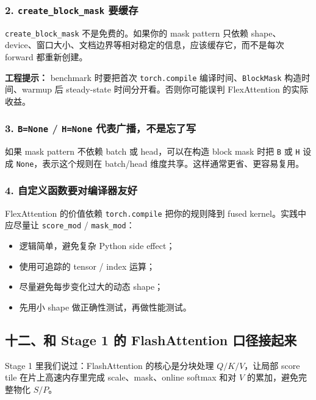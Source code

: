 \subsubsection*{2. \texttt{create\_block\_mask} 要缓存}

\texttt{create\_block\_mask} 不是免费的。如果你的 mask pattern 只依赖 shape、device、窗口大小、文档边界等相对稳定的信息，应该缓存它，而不是每次 forward 都重新创建。

\begin{warnbox}
\textbf{工程提示：} benchmark 时要把首次 \texttt{torch.compile} 编译时间、\texttt{BlockMask} 构造时间、warmup 后 steady-state 时间分开看。否则你可能误判 FlexAttention 的实际收益。
\end{warnbox}

\subsubsection*{3. \texttt{B=None} / \texttt{H=None} 代表广播，不是忘了写}

如果 mask pattern 不依赖 batch 或 head，可以在构造 block mask 时把 \texttt{B} 或 \texttt{H} 设成 \texttt{None}，表示这个规则在 batch/head 维度共享。这样通常更省、更容易复用。

\subsubsection*{4. 自定义函数要对编译器友好}

FlexAttention 的价值依赖 \texttt{torch.compile} 把你的规则降到 fused kernel。实践中应尽量让 \texttt{score\_mod} / \texttt{mask\_mod}：

\begin{itemize}[leftmargin=1.5em]
  \item 逻辑简单，避免复杂 Python side effect；
  \item 使用可追踪的 tensor / index 运算；
  \item 尽量避免每步变化过大的动态 shape；
  \item 先用小 shape 做正确性测试，再做性能测试。
\end{itemize}

\subsection{十二、和 Stage 1 的 FlashAttention 口径接起来}

Stage 1 里我们说过：FlashAttention 的核心是分块处理 $Q/K/V$，让局部 score tile 在片上高速内存里完成 scale、mask、online softmax 和对 $V$ 的累加，避免完整物化 $S/P$。

